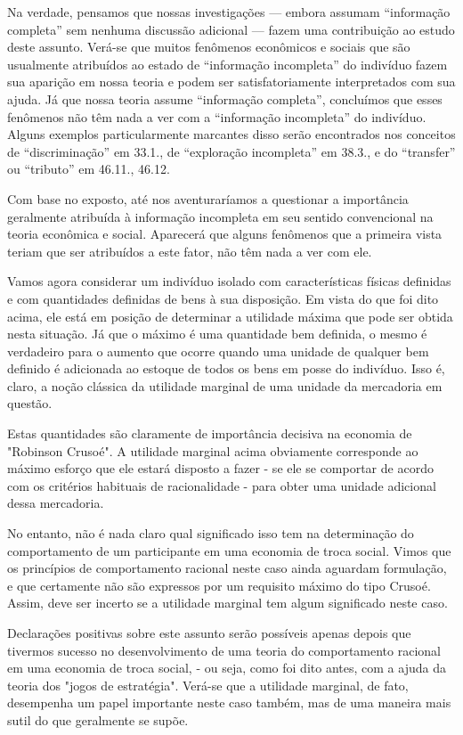 \documentclass[12pt]{article}
\begin{document}
Na verdade, pensamos que nossas investigações --- embora assumam ``informação completa'' sem nenhuma discussão adicional --- fazem uma contribuição ao estudo deste assunto. Verá-se que muitos fenômenos econômicos e sociais que são usualmente atribuídos ao estado de ``informação incompleta'' do indivíduo fazem sua aparição em nossa teoria e podem ser satisfatoriamente interpretados com sua ajuda. Já que nossa teoria assume ``informação completa'', concluímos que esses fenômenos não têm nada a ver com a ``informação incompleta'' do indivíduo. Alguns exemplos particularmente marcantes disso serão encontrados nos conceitos de ``discriminação'' em 33.1., de ``exploração incompleta'' em 38.3., e do ``transfer'' ou ``tributo'' em 46.11., 46.12.

Com base no exposto, até nos aventuraríamos a questionar a importância geralmente atribuída à informação incompleta em seu sentido convencional na teoria econômica e social. Aparecerá que alguns fenômenos que a primeira vista teriam que ser atribuídos a este fator, não têm nada a ver com ele.

Vamos agora considerar um indivíduo isolado com características físicas definidas e com quantidades definidas de bens à sua disposição. Em vista do que foi dito acima, ele está em posição de determinar a utilidade máxima que pode ser obtida nesta situação. Já que o máximo é uma quantidade bem definida, o mesmo é verdadeiro para o aumento que ocorre quando uma unidade de qualquer bem definido é adicionada ao estoque de todos os bens em posse do indivíduo. Isso é, claro, a noção clássica da utilidade marginal de uma unidade da mercadoria em questão.

Estas quantidades são claramente de importância decisiva na economia de "Robinson Crusoé". A utilidade marginal acima obviamente corresponde ao máximo esforço que ele estará disposto a fazer - se ele se comportar de acordo com os critérios habituais de racionalidade - para obter uma unidade adicional dessa mercadoria.

No entanto, não é nada claro qual significado isso tem na determinação do comportamento de um participante em uma economia de troca social. Vimos que os princípios de comportamento racional neste caso ainda aguardam formulação, e que certamente não são expressos por um requisito máximo do tipo Crusoé. Assim, deve ser incerto se a utilidade marginal tem algum significado neste caso.

Declarações positivas sobre este assunto serão possíveis apenas depois que tivermos sucesso no desenvolvimento de uma teoria do comportamento racional em uma economia de troca social, - ou seja, como foi dito antes, com a ajuda da teoria dos "jogos de estratégia". Verá-se que a utilidade marginal, de fato, desempenha um papel importante neste caso também, mas de uma maneira mais sutil do que geralmente se supõe.
\end{document}
